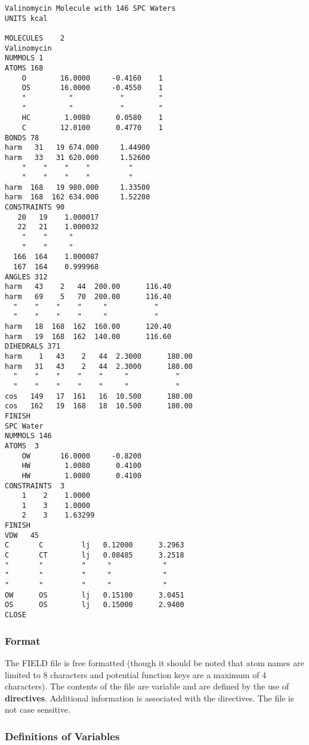 \begin{verbatim}
Valinomycin Molecule with 146 SPC Waters
UNITS kcal

MOLECULES    2
Valinomycin
NUMMOLS 1
ATOMS 168
    O        16.0000     -0.4160    1
    OS       16.0000     -0.4550    1
    "          "           "        "
    "          "           "        "
    HC        1.0080      0.0580    1
    C        12.0100      0.4770    1
BONDS 78
harm   31   19 674.000     1.44900
harm   33   31 620.000     1.52600
    "    "    "    "         "
    "    "    "    "         "
harm  168   19 980.000     1.33500
harm  168  162 634.000     1.52200
CONSTRAINTS 90
   20   19    1.000017
   22   21    1.000032
    "    "     " 
    "    "     " 
  166  164    1.000087
  167  164    0.999968
ANGLES 312
harm   43    2   44  200.00      116.40
harm   69    5   70  200.00      116.40
  "    "    "    "     "           "
  "    "    "    "     "           "
harm   18  168  162  160.00      120.40
harm   19  168  162  140.00      116.60
DIHEDRALS 371
harm    1   43    2   44  2.3000      180.00
harm   31   43    2   44  2.3000      180.00
  "    "    "    "    "     "           "
  "    "    "    "    "     "           "
cos   149   17  161   16  10.500      180.00
cos   162   19  168   18  10.500      180.00
FINISH
SPC Water
NUMMOLS 146
ATOMS  3
    OW       16.0000     -0.8200
    HW        1.0080      0.4100
    HW        1.0080      0.4100
CONSTRAINTS  3
    1    2    1.0000
    1    3    1.0000
    2    3    1.63299
FINISH
VDW   45
C       C         lj   0.12000      3.2963
C       CT        lj   0.08485      3.2518
"       "         "     "            " 
"       "         "     "            " 
"       "         "     "            " 
OW      OS        lj   0.15100      3.0451
OS      OS        lj   0.15000      2.9400
CLOSE
\end{verbatim}

\subsubsection{Format}
The FIELD file is free formatted (though it should be noted that atom
names are limited to 8 characters and potential function keys are a
maximum of 4 characters). The contents of the file are variable
and are defined by the use of {\bf directives}. Additional information
is associated with the directives. The file is not case sensitive.

\subsubsection{Definitions of Variables}

